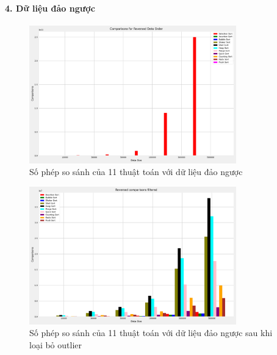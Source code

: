 \paragraph{4. Dữ liệu đảo ngược}
\begin{figure}[H]
    \centering
    \includegraphics[width=0.8\textwidth]{img/results/reversed_comparisons.png}
    \caption{Số phép so sánh của 11 thuật toán với dữ liệu đảo ngược}
\end{figure}

\begin{figure}[H]
    \centering
    \includegraphics[width=0.8\textwidth]{img/results/reversed_comparisons_filtered.png}
    \caption{
        Số phép so sánh của 11 thuật toán với dữ liệu đảo ngược sau khi loại bỏ outlier
    }
\end{figure}